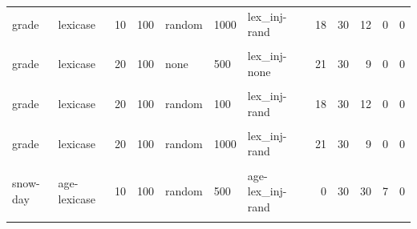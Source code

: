\documentclass[
]{book}
\begin{document}
\begin{table}
\begin{tabular}{l|l|l|l|l|l|l|r|r|r|r|r}
\hline
\cellcolor{gray!6}{grade} & \cellcolor{gray!6}{lexicase} & \cellcolor{gray!6}{10} & \cellcolor{gray!6}{100} & \cellcolor{gray!6}{random} & \cellcolor{gray!6}{500} & \cellcolor{gray!6}{lex\_inj-rand} & \cellcolor{gray!6}{23} & \cellcolor{gray!6}{30} & \cellcolor{gray!6}{7} & \cellcolor{gray!6}{0} & \cellcolor{gray!6}{0}\\
\hline
grade & lexicase & 10 & 100 & random & 1000 & lex\_inj-rand & 18 & 30 & 12 & 0 & 0\\
\hline
\cellcolor{gray!6}{grade} & \cellcolor{gray!6}{lexicase} & \cellcolor{gray!6}{20} & \cellcolor{gray!6}{100} & \cellcolor{gray!6}{none} & \cellcolor{gray!6}{100} & \cellcolor{gray!6}{lex\_inj-none} & \cellcolor{gray!6}{23} & \cellcolor{gray!6}{30} & \cellcolor{gray!6}{7} & \cellcolor{gray!6}{0} & \cellcolor{gray!6}{0}\\
\hline
grade & lexicase & 20 & 100 & none & 500 & lex\_inj-none & 21 & 30 & 9 & 0 & 0\\
\hline
\cellcolor{gray!6}{grade} & \cellcolor{gray!6}{lexicase} & \cellcolor{gray!6}{20} & \cellcolor{gray!6}{100} & \cellcolor{gray!6}{none} & \cellcolor{gray!6}{1000} & \cellcolor{gray!6}{lex\_inj-none} & \cellcolor{gray!6}{16} & \cellcolor{gray!6}{30} & \cellcolor{gray!6}{14} & \cellcolor{gray!6}{0} & \cellcolor{gray!6}{0}\\
\hline
grade & lexicase & 20 & 100 & random & 100 & lex\_inj-rand & 18 & 30 & 12 & 0 & 0\\
\hline
\cellcolor{gray!6}{grade} & \cellcolor{gray!6}{lexicase} & \cellcolor{gray!6}{20} & \cellcolor{gray!6}{100} & \cellcolor{gray!6}{random} & \cellcolor{gray!6}{500} & \cellcolor{gray!6}{lex\_inj-rand} & \cellcolor{gray!6}{24} & \cellcolor{gray!6}{30} & \cellcolor{gray!6}{6} & \cellcolor{gray!6}{0} & \cellcolor{gray!6}{0}\\
\hline
grade & lexicase & 20 & 100 & random & 1000 & lex\_inj-rand & 21 & 30 & 9 & 0 & 0\\
\hline
\cellcolor{gray!6}{snow-day} & \cellcolor{gray!6}{age-lexicase} & \cellcolor{gray!6}{10} & \cellcolor{gray!6}{100} & \cellcolor{gray!6}{random} & \cellcolor{gray!6}{100} & \cellcolor{gray!6}{age-lex\_inj-rand} & \cellcolor{gray!6}{0} & \cellcolor{gray!6}{30} & \cellcolor{gray!6}{30} & \cellcolor{gray!6}{9} & \cellcolor{gray!6}{0}\\
\hline
snow-day & age-lexicase & 10 & 100 & random & 500 & age-lex\_inj-rand & 0 & 30 & 30 & 7 & 0\\
\hline
\cellcolor{gray!6}{snow-day} & \cellcolor{gray!6}{age-lexicase} & \cellcolor{gray!6}{10} & \cellcolor{gray!6}{100} & \cellcolor{gray!6}{random} & \cellcolor{gray!6}{1000} & \cellcolor{gray!6}{age-lex\_inj-rand} & \cellcolor{gray!6}{2} & \cellcolor{gray!6}{30} & \cellcolor{gray!6}{28} & \cellcolor{gray!6}{9} & \cellcolor{gray!6}{0}\\

\end{tabular}
\end{table}
\end{document}
